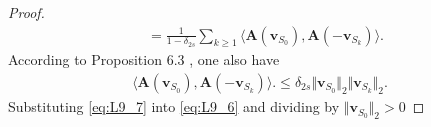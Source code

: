\begin{proof}
\begin{align}
    &= \frac{1}{1 - \delta_{2s}} \sum_{k \geq 1} \langle \textbf{A}(\textbf{v}_{S_0}), \textbf{A}(-\textbf{v}_{S_k}) \rangle.
\end{align}
According to Proposition 6.3 \cite[p. 135]{FR}, one also have
\begin{align}\label{eq:L9_7}
\langle \textbf{A}(\textbf{v}_{S_0}), \textbf{A}(-\textbf{v}_{S_k}) \rangle. \leq \delta_{2s} \Vert \textbf{v}_{S_0} \Vert_2 \Vert \textbf{v}_{S_k} \Vert_2.
\end{align}
Substituting \eqref{eq:L9_7} into \eqref{eq:L9_6} and dividing by $\Vert \mathbf{v}_{S_0} \Vert_2 > 0$
\end{proof}

